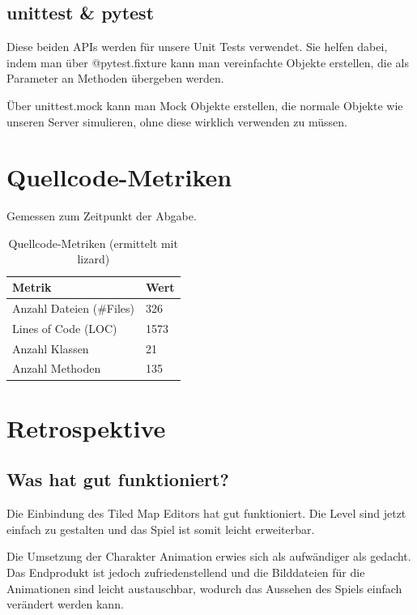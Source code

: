 \documentclass[12pt, a4paper, twoside]{article}
\begin{document}
\subsection{unittest \& pytest}
Diese beiden APIs werden für unsere Unit Tests verwendet. Sie helfen dabei, indem 
man über @pytest.fixture kann man vereinfachte Objekte erstellen, die als Parameter an Methoden 
übergeben werden. 

Über unittest.mock kann man Mock Objekte erstellen, die normale Objekte wie unseren Server 
simulieren, ohne diese wirklich verwenden zu müssen. 


\newpage

\section{Quellcode-Metriken}

Gemessen zum Zeitpunkt der Abgabe.

\begin{table}[H]
  \centering
  \begin{tabular}{ll}
    \toprule
    \rowcolor{primaryblue!20}
    \textbf{Metrik} & \textbf{Wert} \\
    \midrule
    Anzahl Dateien (\#Files)   & 326          \\
    Lines of Code (LOC)        & 1573          \\
    Anzahl Klassen             & 21          \\
    Anzahl Methoden            & 135          \\
    \bottomrule
  \end{tabular}
  \caption{Quellcode-Metriken (ermittelt mit lizard)}
\end{table}

\section{Retrospektive}

\subsection{Was hat gut funktioniert?}
Die Einbindung des Tiled Map Editors hat gut funktioniert. 
Die Level sind jetzt einfach zu gestalten und das Spiel ist somit leicht erweiterbar.

Die Umsetzung der Charakter Animation erwies sich als aufwändiger als gedacht. Das Endprodukt
ist jedoch zufriedenstellend und die Bilddateien für die Animationen sind leicht austauschbar,
wodurch das Aussehen des Spiels einfach verändert werden kann.
\end{document}
